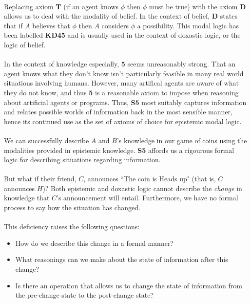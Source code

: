 \documentclass[12pt, a4paper, twoside]{article}
\begin{document}
\\
Replacing axiom {\bf T} (if an agent knows $\phi$ then $\phi$ must be true) with
the axiom {\bf D} allows us to deal with the modality of belief.
In the context of belief, {\bf D} states that if $A$ believes that $\phi$ then
$A$ considers $\phi$ a possibility.
This modal logic has been labelled {\bf KD45} and is usually used in the context
of doxastic logic, or the logic of belief.\\
\\
In the context of knowledge especially, {\bf 5} seems unreasonably strong.
That an agent knows what they don't know isn't particularly feasible in many
real world situations involving humans.
However, many artifical agents are aware of what they do not know, and thus
{\bf 5} is a reasonable axiom to impose when reasoning about artificial agents
or programs.
Thus, {\bf S5} most suitably captures information and relates possible
worlds of information back in the most sensible manner, hence its continued use
as the set of axioms of choice for epistemic modal logic. \citep{hoek2008dynamic}\\
\\
We can successfully describe $A$ and $B$'s knowledge in our game of coins using
the modalities provided in epistemic knowledge.
{\bf S5} affords us a rigourous formal logic for describing situations regarding
information.\\
\\
But what if their friend, $C$, announces ``The coin is Heads up" (that is,
$C$ announces $H$)?
Both epistemic and doxastic logic cannot describe the {\em change} in knowledge that
$C$'s announcement will entail.
Furthermore, we have no formal process to say how the situation has changed.\\
\\
This deficiency raises the following questions:
\begin{itemize}
	\item How do we describe this change in a formal manner?
	\item What reasonings can we make about the state of information after this
	change?
	\item Is there an operation that allows us to change the state of information
	from the pre-change state to the post-change state?
\end{itemize}
\end{document}
